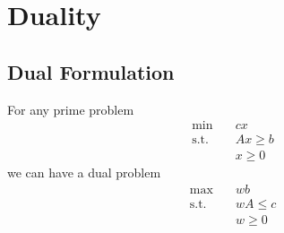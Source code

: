     \section{Duality}
        \subsection{Dual Formulation}
            For any prime problem
            \begin{align}
                \text{min} \quad & cx \nonumber\\
                \text{s.t.} \quad & Ax\ge b \nonumber\\
                            & x\ge 0 \nonumber
            \end{align}
            we can have a dual problem
            \begin{align}
                \text{max} \quad & wb \nonumber \\
                \text{s.t.} \quad & wA\le c\nonumber\\
                            & w \ge 0\nonumber
            \end{align}
            
